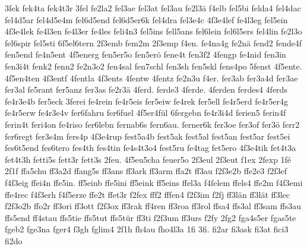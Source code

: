 {    3fek
    fek4ta
    fek4t3r
    3fel
    fe2la2
    fel3ae
    fel3at
    fel3au
    fe2l3ä
    f4elb
    fel5bi
    felda4
    fel4dac
    fel4d5ar
    fel4d5e4m
    fel6d5end
    fel6d5er6k
    fel4dra
    fel3e4c
    4f3e4lef
    fe4l3eg
    fel5ein
    4f3e4lek
    fe4l3en
    fe4l3er
    fe4les
    feli4n3
    fel5ins
    fell5ans
    fel6lein
    fel6l5ers
    fel4lin
    fe2l3o
    fel6spir
    fel5sti
    6f5el6tern
    2f3emb
    fem2m
    2f3emp
    f4en.
    fe4na4g
    fe2nä
    fend2
    fende4f
    fen5end
    fe4n5ent
    4f5energ
    fen5er5o
    fen5erö
    fene4t
    fen3f2
    4fengp
    fe4nid
    fen3in
    fen3i4t
    fenk2
    fenn2
    fe2n3o2
    fen4sal
    fen7schl
    fen3sh
    fen5skl
    fens4po
    5fenst
    4f5ente.
    4f5en4ten
    4f3entf
    4fentla
    4f3ents
    4fentw
    4fentz
    fe2n3u
    f4er.
    fer3ab
    fer3a4d
    fer3ae
    fer3al
    fe5rant
    fer5anz
    fer3as
    fe2r3ä
    4ferd.
    ferde3
    4ferde.
    4ferden
    ferdes4
    4ferds
    fe4r3e4b
    fer5eck
    3ferei
    fe4rein
    fe4r5eis
    fer5eiw
    fe4rek
    fer5ell
    fe4r5erd
    fe4r5er4g
    fe4r5erw
    fe4r3e4v
    fer6fahru
    fer6fuel
    4f5er4fül
    6fergebn
    fe4r3i4d
    ferien5
    ferin4f
    ferin4t
    feri4on
    fe4riso
    fer6lebn
    fernab6s
    fern6au.
    ferner6k
    fer3oe
    fer3of
    fer3ö
    ferr2
    fer6regt
    fer3s4m
    fers4p
    4f3e4rup
    fest5a4b
    fest5ak
    fest5al
    fest5an
    fest5ar
    fest5ei
    fes6t5end
    fes6tero
    fes4th
    fes4tin
    fe4s4t3o4
    fest5ru
    fe4tag
    fet5ero
    4f3e4tik
    fet4t3a
    fet4t3h
    fetti5s
    fett3r
    fett3s
    2feu.
    4f5eu5cha
    feuer5o
    2f3eul
    2f3eut
    f1ex
    2fexp
    1fé
    2f1f
    ffa5chu
    ff3a2d
    ffang5s
    ff3ans
    ff3ark
    ff3arm
    ffa2t
    ff3au
    f2f3e2b
    ffe2e3
    f2f3ef
    f4f3eig
    ffei4n
    ffe5in.
    ff5einb
    ffe5ini
    ff5eink
    ff5eins
    ffel3a
    f4felem
    ffels4
    ffe2m
    f4f3emi
    ffe4rec
    f4f3erh
    f4f5erze
    ffe2t
    ffet3r
    f2fex
    fff2
    fffen4
    f2f3im
    f2fj
    ff3län
    ff3lät
    ff3lec
    f2f3o2b
    ffo2r
    ff3ori
    ff3ott
    f2f3ox
    ff3rak
    ff4ren
    ff3roa
    ff3rol
    ffsa4
    ffs3al
    ff3sam
    ffs3au
    ffs5end
    ff4stau
    ffs5tie
    ffs5tut
    ffs5tür
    ff3ti
    f2f3um
    ff3urs
    f2fy
    2fg2
    fga4s5er
    fgas5te
    fgeb2
    fge3na
    fger4
    f3gh
    fglim4
    2f1h
    fh4au
    fho4l3a
    1fi
    3fi.
    fi2ar
    fi3ask
    fi3at
    fici3
    fi2do
}
